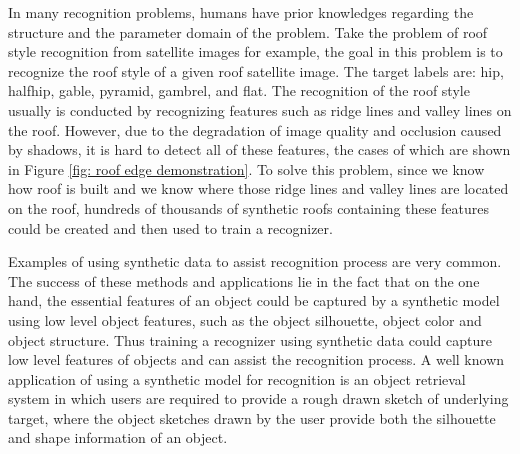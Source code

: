 \documentclass{iitthesis}
\begin{document}
In many recognition problems, humans have prior knowledges regarding the structure and the parameter domain of the problem. Take the problem of roof style recognition from satellite images for example, the goal in this problem is to recognize the roof style of a given roof satellite image. The target labels are: hip, halfhip, gable, pyramid, gambrel, and flat. The recognition of the roof style usually is conducted by recognizing features such as ridge lines and valley lines on the roof. However, due to the degradation of image quality and occlusion caused by shadows, it is hard to detect all of these features, the cases of which are shown in Figure \ref{fig: roof edge demonstration}. To solve this problem, since we know how roof is built and we know where those ridge lines and valley lines are located on the roof, hundreds of thousands of synthetic roofs containing these features could be created and then used to train a recognizer. 

Examples of using synthetic data to assist recognition process are very common. The success of these methods and applications lie in the fact that on the one hand, the essential features of an object could be captured by a synthetic model using low level object features, such as the object silhouette, object color and object structure. Thus training a recognizer using synthetic data could capture low level features of objects and can assist the recognition process. A well known application of using a synthetic model for recognition is an object retrieval system in which users are required to provide a rough drawn sketch of underlying target\cite{WC:10}, where the object sketches drawn by the user provide both the silhouette and shape information of an object.
\end{document}
